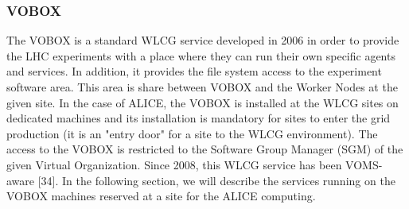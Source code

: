 \subsubsection{VOBOX}
%
The VOBOX \cite{VOBOX} is a standard WLCG service developed in 2006 in order
to provide the LHC experiments with a place where they can run their
own specific agents and services. In addition, it
provides the file system access to the experiment software area.
This area is share between VOBOX and the Worker Nodes at the given
site.  In the case of ALICE, the VOBOX is installed at the WLCG sites on dedicated machines
and its installation is mandatory for sites to enter the grid
production (it is an "entry door" for a site to the WLCG
environment). The access to the VOBOX is restricted to the Software
Group Manager (SGM) of the given Virtual Organization. Since 2008,
this WLCG service has been VOMS-aware [34]. In the following
section, we will describe the services running on the VOBOX machines
reserved at a site for the ALICE computing.
